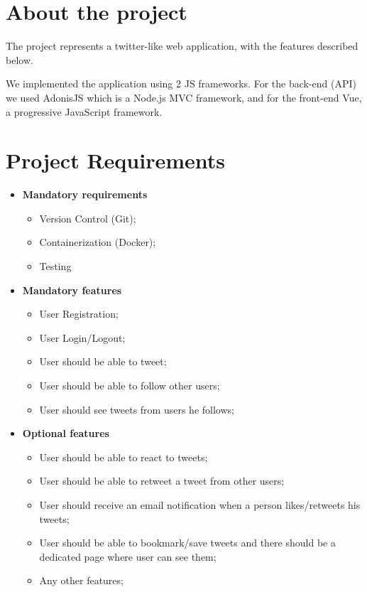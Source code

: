 \section{About the project}
The project represents a twitter-like web application, with the features described below. 

We implemented the application using 2 JS frameworks. For the back-end (API) we used AdonisJS which is a Node.js MVC framework, and for the front-end Vue, a progressive JavaScript framework.  


\section{Project Requirements}
\begin{itemize}
	\item \textbf{Mandatory requirements}
		  \begin{itemize}
		      \item Version Control (Git);
			  \item Containerization (Docker);
	     	  \item Testing
		  \end{itemize}
	\item \textbf{Mandatory features}
	      \begin{itemize}
		      \item User Registration;
		      \item User Login/Logout;
		      \item User should be able to tweet;
		      \item User should be able to follow other users;
		      \item User should see tweets from users he follows;
	      \end{itemize}
	\item \textbf{Optional features}
	      \begin{itemize}
		      \item User should be able to react to tweets;
		      \item User should be able to retweet a tweet from other users;
		      \item User should receive an email notification when a person likes/retweets his tweets;
		      \item User should be able to bookmark/save tweets and there should be a dedicated page where user can see them;
		      \item Any other features;
	      \end{itemize}
\end{itemize}

\clearpage